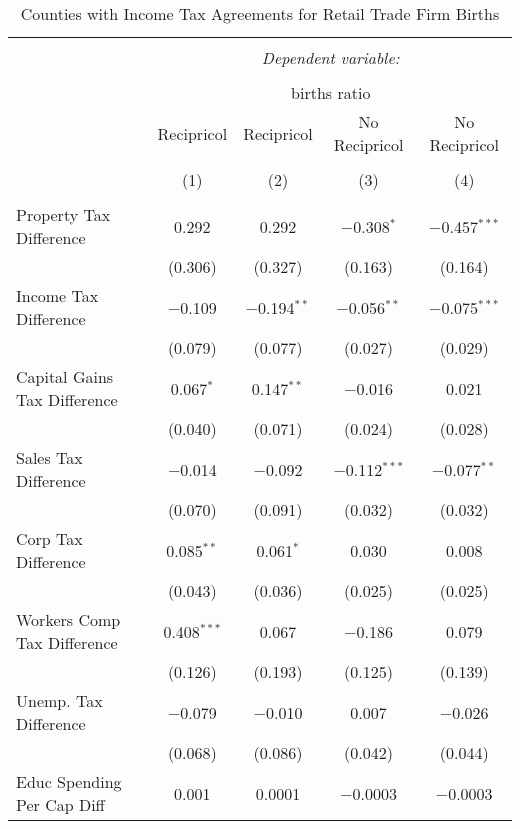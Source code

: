 
\begin{table}[!htbp] \centering 
  \caption{Counties with Income Tax Agreements for  Retail Trade Firm Births} 
  \label{44-45rd} 
\begin{tabular}{@{\extracolsep{5pt}}lcccc} 
\\[-1.8ex]\hline 
\hline \\[-1.8ex] 
 & \multicolumn{4}{c}{\textit{Dependent variable:}} \\ 
\cline{2-5} 
\\[-1.8ex] & \multicolumn{4}{c}{births ratio} \\ 
 & Recipricol & Recipricol & No Recipricol & No Recipricol \\ 
\\[-1.8ex] & (1) & (2) & (3) & (4)\\ 
\hline \\[-1.8ex] 
 Property Tax Difference & 0.292 & 0.292 & $-$0.308$^{*}$ & $-$0.457$^{***}$ \\ 
  & (0.306) & (0.327) & (0.163) & (0.164) \\ 
  Income Tax Difference & $-$0.109 & $-$0.194$^{**}$ & $-$0.056$^{**}$ & $-$0.075$^{***}$ \\ 
  & (0.079) & (0.077) & (0.027) & (0.029) \\ 
  Capital Gains Tax Difference & 0.067$^{*}$ & 0.147$^{**}$ & $-$0.016 & 0.021 \\ 
  & (0.040) & (0.071) & (0.024) & (0.028) \\ 
  Sales Tax Difference & $-$0.014 & $-$0.092 & $-$0.112$^{***}$ & $-$0.077$^{**}$ \\ 
  & (0.070) & (0.091) & (0.032) & (0.032) \\ 
  Corp Tax Difference & 0.085$^{**}$ & 0.061$^{*}$ & 0.030 & 0.008 \\ 
  & (0.043) & (0.036) & (0.025) & (0.025) \\ 
  Workers Comp Tax Difference & 0.408$^{***}$ & 0.067 & $-$0.186 & 0.079 \\ 
  & (0.126) & (0.193) & (0.125) & (0.139) \\ 
  Unemp. Tax Difference & $-$0.079 & $-$0.010 & 0.007 & $-$0.026 \\ 
  & (0.068) & (0.086) & (0.042) & (0.044) \\ 
  Educ Spending Per Cap Diff & 0.001 & 0.0001 & $-$0.0003 & $-$0.0003 \\ 

\end{tabular}
\end{table}
